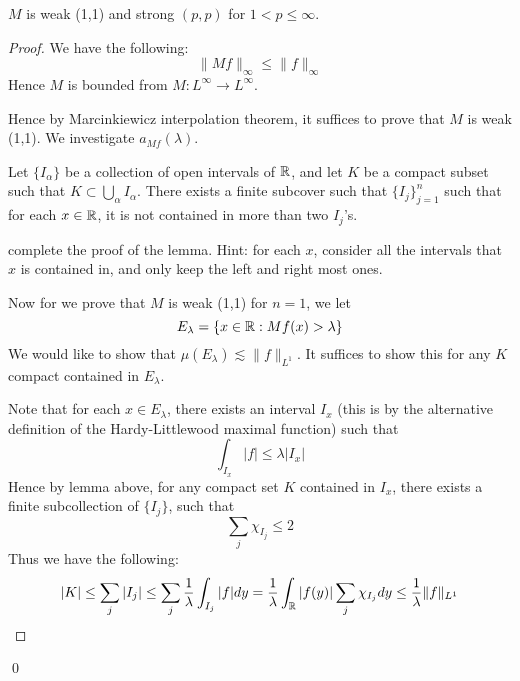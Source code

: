\begin{theorem}
    $M$ is weak (1,1) and strong $(p,p)$ for $1<p\leq\infty$.
\end{theorem}
\begin{proof}
    We have the following:
    \begin{equation*}
        \|Mf\|_\infty\leq\|f\|_{\infty}
    \end{equation*}
    Hence $M$ is bounded from $M:L^\infty\to L^\infty$.
    
    Hence by Marcinkiewicz interpolation theorem, it suffices to prove that $M$ is weak (1,1). We investigate $a_{Mf}(\lambda)$. 
    \begin{lemma}
        Let $\{I_\alpha\}$ be a collection of open intervals of $\mathbb{R}$, and let $K$ be a compact subset such that $K\subset\bigcup_\alpha I_\alpha$. There exists a finite subcover such that $\{I_j\}_{j=1}^n$ such that for each $x\in \mathbb{R}$, it is not contained in more than two $I_j$'s.
    \end{lemma}
    \begin{exercise}
        complete the proof of the lemma. Hint: for each $x$, consider all the intervals that $x$ is contained in, and only keep the left and right most ones.
    \end{exercise}

    Now for we prove that $M$ is weak (1,1) for \textbf{$n=1$}, we let
    \begin{equation*}
        E_\lambda=\{x\in\mathbb{R}: Mf(x)>\lambda\}
    \end{equation*}
    We would like to show that $\mu(E_\lambda)\lesssim \|f\|_{L^1}$. It suffices to show this for any $K$ compact contained in $E_\lambda$.

    Note that for each $x\in E_\lambda$, there exists an interval $I_x$ (this is by the alternative definition of the Hardy-Littlewood maximal function) such that 
    \begin{equation*}
        \int_{I_x}|f|\leq\lambda|I_x|
    \end{equation*}
    Hence by lemma above, for any compact set $K$ contained in $I_x$, there exists a finite subcollection of $\{I_j\}$, such that 
    \begin{equation*}
        \sum_j\chi_{I_j}\leq 2
    \end{equation*}
    Thus we have the following:
    \begin{equation*}
        |K|\leq\sum_j|I_j|\leq\sum_j\frac{1}{\lambda}\int_{I_j}|f|dy= \frac{1}{\lambda}\int_{\mathbb{R}}|f(y)|\sum_j\chi_{I_j}dy\leq \frac{1}{\lambda}\|f\|_{L^1}
    \end{equation*}
\end{proof}
\qed

